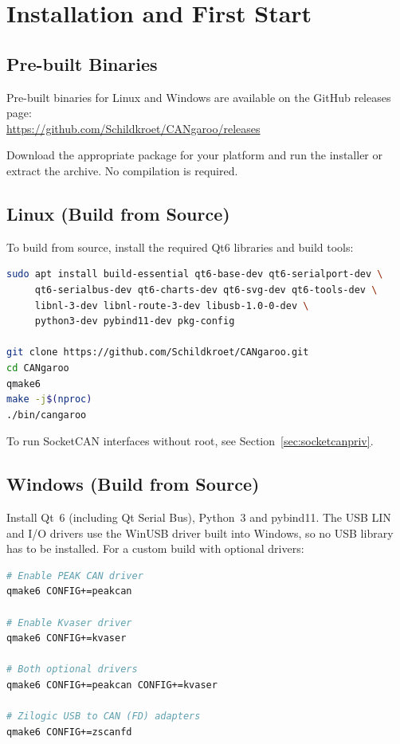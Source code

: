 \documentclass[a4paper,11pt]{article}
\begin{document}
\section{Installation and First Start}

\subsection{Pre-built Binaries}

Pre-built binaries for Linux and Windows are available on the GitHub releases page:\\
\url{https://github.com/Schildkroet/CANgaroo/releases}

Download the appropriate package for your platform and run the installer or extract
the archive. No compilation is required.

\subsection{Linux (Build from Source)}

To build from source, install the required Qt6 libraries and build tools:

\begin{lstlisting}[language=bash, caption={Build on Linux}]
sudo apt install build-essential qt6-base-dev qt6-serialport-dev \
     qt6-serialbus-dev qt6-charts-dev qt6-svg-dev qt6-tools-dev \
     libnl-3-dev libnl-route-3-dev libusb-1.0-0-dev \
     python3-dev pybind11-dev pkg-config

git clone https://github.com/Schildkroet/CANgaroo.git
cd CANgaroo
qmake6
make -j$(nproc)
./bin/cangaroo
\end{lstlisting}

To run SocketCAN interfaces without root, see Section~\ref{sec:socketcanpriv}.

\subsection{Windows (Build from Source)}

Install Qt~6 (including Qt Serial Bus), Python~3 and pybind11. The USB LIN and
I/O drivers use the WinUSB driver built into Windows, so no USB library has to
be installed. For a custom build with optional drivers:

\begin{lstlisting}[language=bash, caption={Optional driver flags}]
# Enable PEAK CAN driver
qmake6 CONFIG+=peakcan

# Enable Kvaser driver
qmake6 CONFIG+=kvaser

# Both optional drivers
qmake6 CONFIG+=peakcan CONFIG+=kvaser

# Zilogic USB to CAN (FD) adapters
qmake6 CONFIG+=zscanfd
\end{lstlisting}
\end{document}
